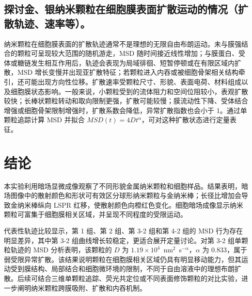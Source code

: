 \documentclass[a4paper]{article}
\begin{document}
\subsection{探讨金、银纳米颗粒在细胞膜表面扩散运动的情况（扩散轨迹、速率等）。}

纳米颗粒在细胞膜表面的扩散轨迹通常不是理想的无限自由布朗运动。未与膜强结合的颗粒可呈现较大范围的随机游走，MSD 随时间接近线性增加；与膜蛋白、受体或糖链发生相互作用后，轨迹会表现为局域徘徊、短暂停顿或在有限区域内扩散，MSD 增长变慢并出现亚扩散特征；若颗粒进入内吞或被细胞骨架相关结构牵引，还可能出现方向性位移。扩散速率受颗粒尺寸、形貌、表面电荷、材料组成以及细胞膜状态影响。一般来说，小颗粒受到的流体阻力和空间位阻较小，表观扩散较快；长棒状颗粒转动和取向限制更强，扩散可能较慢；膜流动性下降、受体结合增强或细胞骨架限制增强时，扩散系数会降低，异常扩散指数也会小于 1。通过单颗粒追踪计算 MSD 并拟合 $MSD(t)=4Dt^{\alpha}$，可对这种扩散状态进行定量表征。

\section{结论}
\vspace{-0.5em}

本实验利用暗场显微成像观察了不同形貌金属纳米颗粒和细胞样品。结果表明，暗场图像中的散射颜色和形状可有效区分球形纳米颗粒与金纳米棒；长径比增加会导致金纳米棒纵向 LSPR 红移，使散射颜色向橙红色变化。细胞暗场成像显示纳米颗粒可富集于细胞膜相关区域，并呈现不同程度的受限运动。

代表性轨迹比较显示，第 1 组、第 2 组、第 3-2 组和第 4-2 组的 MSD 行为存在明显差异，其中第 3-2 组曲线增长较稳定，更适合展开定量讨论。对第 3-2 组单颗粒轨迹的 MSD 分析表明，该颗粒的 $D$ 为 $1.19\times10^{4}$~nm$^2$~s$^{-\alpha}$，$\alpha$ 为 0.833，属于弱受限异常扩散。该结果说明颗粒在细胞膜相关区域仍具有明显移动能力，但其运动受到膜结构、局部结合和细胞微环境的限制，不同于自由溶液中的理想布朗扩散。后续可结合三维单颗粒追踪、荧光共定位或不同表面修饰颗粒的对比实验，进一步阐明纳米颗粒跨膜吸附、扩散和内吞机制。
\end{document}
